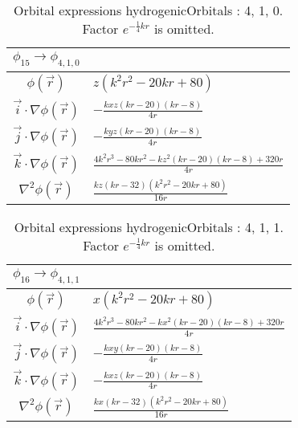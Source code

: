 \begin{table}
\begin{center}
\begin{tabular}{c|l}
$\phi_{15} \rightarrow \phi_{4, 1, 0}$\\
\hline
$\phi(\vec r)$ & $z \left(k^{2} r^{2} - 20 k r + 80\right)$\\
\hline
$\vec i\cdot \nabla \phi(\vec r)$ & $- \frac{k x z \left(k r -20\right) \left(k r -8\right)}{4 r}$\\
$\vec j\cdot \nabla \phi(\vec r)$ & $- \frac{k y z \left(k r -20\right) \left(k r -8\right)}{4 r}$\\
$\vec k\cdot \nabla \phi(\vec r)$ & $\frac{4 k^{2} r^{3} - 80 k r^{2} - k z^{2} \left(k r -20\right) \left(k r -8\right) + 320 r}{4 r}$\\
\hline
$\nabla^2 \phi(\vec r)$ & $\frac{k z \left(k r -32\right) \left(k^{2} r^{2} - 20 k r + 80\right)}{16 r}$\\
\end{tabular}
\caption{Orbital expressions hydrogenicOrbitals : 4, 1, 0. Factor $e^{- \frac{1}{4} k r}$ is omitted.}
\end{center}
\end{table}

\clearpage

\begin{table}
\begin{center}
\begin{tabular}{c|l}
$\phi_{16} \rightarrow \phi_{4, 1, 1}$\\
\hline
$\phi(\vec r)$ & $x \left(k^{2} r^{2} - 20 k r + 80\right)$\\
\hline
$\vec i\cdot \nabla \phi(\vec r)$ & $\frac{4 k^{2} r^{3} - 80 k r^{2} - k x^{2} \left(k r -20\right) \left(k r -8\right) + 320 r}{4 r}$\\
$\vec j\cdot \nabla \phi(\vec r)$ & $- \frac{k x y \left(k r -20\right) \left(k r -8\right)}{4 r}$\\
$\vec k\cdot \nabla \phi(\vec r)$ & $- \frac{k x z \left(k r -20\right) \left(k r -8\right)}{4 r}$\\
\hline
$\nabla^2 \phi(\vec r)$ & $\frac{k x \left(k r -32\right) \left(k^{2} r^{2} - 20 k r + 80\right)}{16 r}$\\
\end{tabular}
\caption{Orbital expressions hydrogenicOrbitals : 4, 1, 1. Factor $e^{- \frac{1}{4} k r}$ is omitted.}
\end{center}
\end{table}


